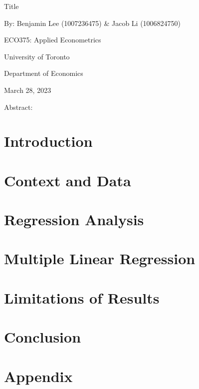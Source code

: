 \documentclass{eco_375_paper}
\begin{document}
\vspace*{\fill}
\begin{center}
	Title 
	
	By: Benjamin Lee (1007236475) \& Jacob Li (1006824750)
	\bigskip
	
	ECO375: Applied Econometrics 
	
	University of Toronto
	
	Department of Economics
	
	March 28, 2023
	
	\bigskip
	Abstract:
\end{center}
\vspace*{\fill}
\pagebreak

\section{Introduction}
\section{Context and Data}

\section{Regression Analysis}
\section{Multiple Linear Regression}
\section{Limitations of Results}
\section{Conclusion}
\section{Appendix}
\end{document}
